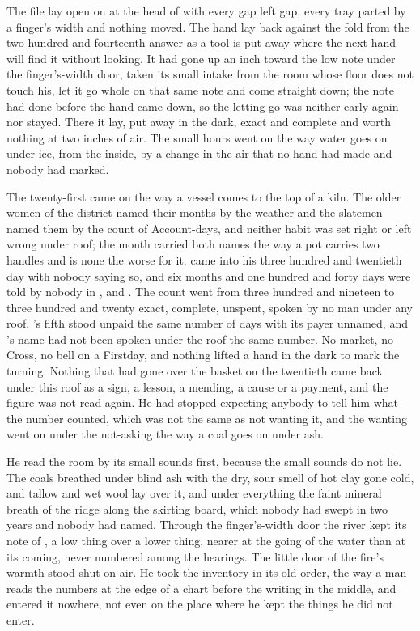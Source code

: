 
The file lay open on  at the head of  with every gap left gap, every tray parted by a finger's width and nothing moved. The hand lay back against the fold from the two hundred and fourteenth answer as a tool is put away where the next hand will find it without looking. It had gone up an inch toward the low note under the finger's-width door, taken its small intake from the room whose floor does not touch his, let it go whole on that same note and come straight down; the note had done before the hand came down, so the letting-go was neither early again nor stayed. There it lay, put away in the dark, exact and complete and worth nothing at two inches of air. The small hours went on the way water goes on under ice, from the inside, by a change in the air that no hand had made and nobody had marked.

The twenty-first came on the way a vessel comes to the top of a kiln. The older women of the district named their months by the weather and the slatemen named them by the count of Account-days, and neither habit was set right or left wrong under  roof; the month carried both names the way a pot carries two handles and is none the worse for it.  came into his three hundred and twentieth day with nobody saying so, and six months and one hundred and forty days were told by nobody in ,  and . The count went from three hundred and nineteen to three hundred and twenty exact, complete, unspent, spoken by no man under any roof. 's fifth stood unpaid the same number of days with its payer unnamed, and 's name had not been spoken under the roof the same number. No market, no Cross, no bell on a Firstday, and nothing lifted a hand in the dark to mark the turning. Nothing that had gone over the basket on the twentieth came back under this roof as a sign, a lesson, a mending, a cause or a payment, and the figure was not read again. He had stopped expecting anybody to tell him what the number counted, which was not the same as not wanting it, and the wanting went on under the not-asking the way a coal goes on under ash.

He read the room by its small sounds first, because the small sounds do not lie. The coals breathed under blind ash with the dry, sour smell of hot clay gone cold, and tallow and wet wool lay over it, and under everything the faint mineral breath of the  ridge along the skirting board, which nobody had swept in two years and nobody had named. Through the finger's-width door the river kept its note of , a low thing over a lower thing, nearer at the going of the water than at its coming, never numbered among the hearings. The little door of the fire's warmth stood shut on air. He took the inventory in its old order, the way a man reads the numbers at the edge of a chart before the writing in the middle, and entered it nowhere, not even on the place where he kept the things he did not enter.

